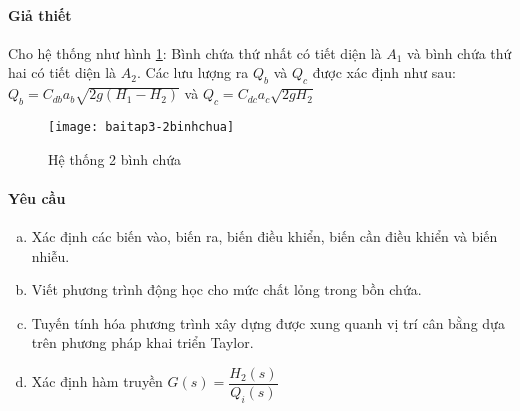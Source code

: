 \paragraph{Giả thiết}
    Cho hệ thống như hình \ref{baitap3-2binhchua}: Bình chứa thứ nhất có tiết diện là $A_1$ và bình chứa thứ hai có tiết diện là $A_2$. Các lưu lượng ra $Q_b$ và $Q_c$ được xác định như sau: $Q_b = C_{db}a_b\sqrt{2g(H_1 - H_2)}$ và $Q_c = C_{dc}a_c\sqrt{2gH_2}$
    \begin{figure}[htp]
        \begin{center}
            \texttt{[image: baitap3-2binhchua]}
        \end{center}
        \caption{Hệ thống 2 bình chứa} \label{baitap3-2binhchua}
    \end{figure}

\paragraph{Yêu cầu}
    \begin{enumerate}[a.]
        \item Xác định các biến vào, biến ra, biến điều khiển, biến cần điều khiển và biến nhiễu.
        \item Viết phương trình động học cho mức chất lỏng trong bồn chứa.
        \item Tuyến tính hóa phương trình xây dựng được xung quanh vị trí cân bằng dựa trên phương pháp khai triển Taylor.
        \item Xác định hàm truyền $G(s) = \dfrac{H_2(s)}{Q_i(s)}$
    \end{enumerate}


